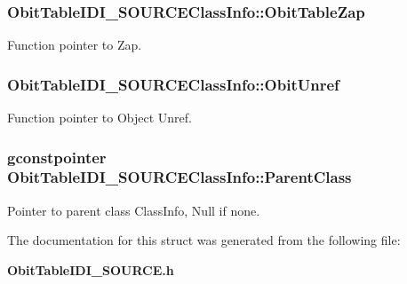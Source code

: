 \subsubsection{ {\bf Obit\-Table\-IDI\_\-SOURCEClass\-Info::Obit\-Table\-Zap}}\label{structObitTableIDI__SOURCEClassInfo_o19}


Function pointer to Zap. 

\subsubsection{ {\bf Obit\-Table\-IDI\_\-SOURCEClass\-Info::Obit\-Unref}}\label{structObitTableIDI__SOURCEClassInfo_o11}


Function pointer to Object Unref. 

\subsubsection{\setlength{\rightskip}{0pt plus 5cm}gconstpointer {\bf Obit\-Table\-IDI\_\-SOURCEClass\-Info::Parent\-Class}}\label{structObitTableIDI__SOURCEClassInfo_o3}


Pointer to parent class Class\-Info, Null if none. 



The documentation for this struct was generated from the following file:\begin{CompactItemize}
\item 
{\bf Obit\-Table\-IDI\_\-SOURCE.h}\end{CompactItemize}
